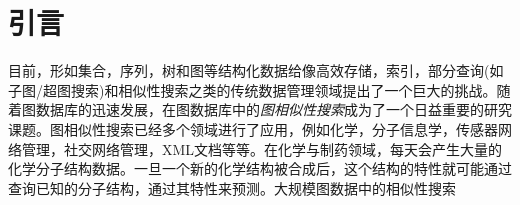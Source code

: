 \documentclass{article}
\begin{document}
\else

\fi
\section{引言}
目前，形如集合，序列，树和图等结构化数据给像高效存储，索引，部分查询(如子图/超图搜索)和相似性搜索之类的传统数据管理领域提出了一个巨大的挑战。随着图数据库的迅速发展，在图数据库中的\emph{图相似性搜索}成为了一个日益重要的研究课题。图相似性搜索已经多个领域进行了应用，例如化学，分子信息学，传感器网络管理，社交网络管理，XML文档等等。在化学与制药领域，每天会产生大量的化学分子结构数据。一旦一个新的化学结构被合成后，这个结构的特性就可能通过查询已知的分子结构，通过其特性来预测。大规模图数据中的相似性搜索

\ifx\allfiles\undefined
%
%
\end{document}

